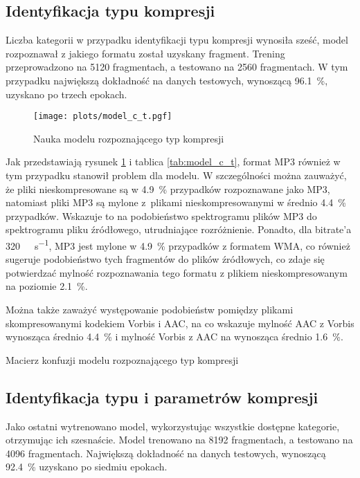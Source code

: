 \documentclass[pl,12pt]{aghdpl}
\let\Oldsubsection\subsection%
\renewcommand{\subsection}{\FloatBarrier\Oldsubsection}
\begin{document}
\subsection{Identyfikacja typu kompresji}
Liczba kategorii w przypadku identyfikacji typu kompresji wynosiła sześć, model
rozpoznawał z jakiego formatu został uzyskany fragment. Trening przeprowadzono
na 5120 fragmentach, a testowano na 2560 fragmentach. W tym przypadku
największą dokładność na danych testowych, wynoszącą \SI{96.1}{\percent},
uzyskano po trzech epokach.

\begin{figure}[!tbh]
  \centering
  \texttt{[image: plots/model\_c\_t.pgf]}
  \caption{Nauka modelu rozpoznającego typ kompresji}
  \label{fig:model_c_t}
\end{figure}

Jak przedstawiają rysunek \ref{fig:model_c_t} i tablica \ref{tab:model_c_t},
format MP3 również w tym przypadku stanowił problem dla modelu. W szczególności
można zauważyć, że pliki nieskompresowane są w \SI{4.9}{\percent} przypadków
rozpoznawane jako MP3, natomiast pliki MP3 są mylone z~plikami
nieskompresowanymi w średnio \SI{4.4}{\percent} przypadków. Wskazuje to na
podobieństwo spektrogramu plików MP3 do spektrogramu pliku źródłowego,
utrudniające rozróżnienie. Ponadto, dla bitrate'a
\SI{320}{\kibi\bit\per\second}, MP3 jest mylone w \SI{4.9}{\percent} przypadków
z formatem WMA, co również sugeruje podobieństwo tych fragmentów do plików
źródłowych, co zdaje się potwierdzać mylność rozpoznawania tego formatu z
plikiem nieskompresowanym na poziomie \SI{2.1}{\percent}.

Można także zaważyć występowanie podobieństw pomiędzy plikami skompresowanymi
kodekiem Vorbis i AAC, na co wskazuje mylność AAC z Vorbis wynosząca średnio
\SI{4.4}{\percent} i mylność Vorbis z AAC na wynosząca średnio
\SI{1.6}{\percent}.
\begin{table}[!tbh]
  \centering
  \caption{Macierz konfuzji modelu rozpoznającego typ kompresji}
  
  \label{tab:model_c_t}
\end{table}
\subsection{Identyfikacja typu i parametrów kompresji}
Jako ostatni wytrenowano model, wykorzystując wszystkie dostępne kategorie,
otrzymując ich szesnaście. Model trenowano na 8192 fragmentach, a testowano na
4096 fragmentach. Największą dokładność na danych testowych, wynoszącą
\SI{92.4}{\percent} uzyskano po siedmiu epokach.
\end{document}
